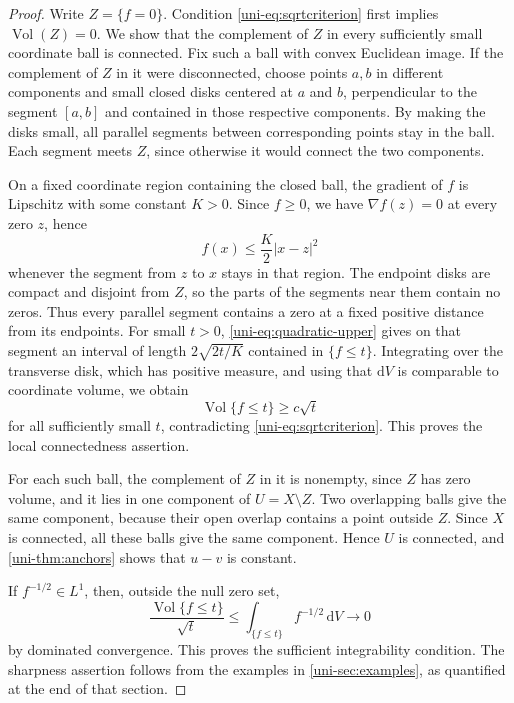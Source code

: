 \begin{proof}
Write $Z=\{f=0\}$.  Condition \eqref{uni-eq:sqrtcriterion} first implies
$\operatorname{Vol}(Z)=0$.  We show that the complement of $Z$ in every sufficiently
small coordinate ball is connected.  Fix such a ball with convex Euclidean
image.  If the complement of $Z$ in it were disconnected, choose points $a,b$ in
different components and small closed disks centered at $a$ and $b$, perpendicular to the
segment $[a,b]$ and contained in those respective components.  By making
the disks small, all parallel segments between corresponding points stay
in the ball.  Each segment meets $Z$, since otherwise it would connect
the two components.

On a fixed coordinate region containing the closed ball, the gradient of $f$ is
Lipschitz with some constant $K>0$.  Since $f\geq0$, we have
$\nabla f(z)=0$ at every zero $z$, hence
\begin{equation}\label{uni-eq:quadratic-upper}
 f(x)\leq\frac K2|x-z|^2
\end{equation}
whenever the segment from $z$ to $x$ stays in that region.  The endpoint
disks are compact and disjoint from $Z$, so the parts of the segments near them
contain no zeros.  Thus every parallel segment contains a zero
at a fixed positive distance from its endpoints.  For small $t>0$,
\eqref{uni-eq:quadratic-upper} gives on that segment an interval of length
$2\sqrt{2t/K}$ contained in $\{f\leq t\}$.  Integrating over the
transverse disk, which has positive measure, and using that $\mathrm{d}V$ is comparable to
coordinate volume, we obtain
\[
 \operatorname{Vol}\{f\leq t\}\geq c\sqrt t
\]
for all sufficiently small $t$, contradicting
\eqref{uni-eq:sqrtcriterion}.  This proves the local connectedness assertion.

For each such ball, the complement of $Z$ in it is nonempty, since $Z$ has zero
volume, and it lies in one component of $U=X\setminus Z$.
Two overlapping balls give the same component, because their open overlap
contains a point outside $Z$.  Since $X$ is connected, all these balls give the same component.
Hence $U$ is connected,
and \cref{uni-thm:anchors} shows that $u-v$ is constant.

If $f^{-1/2}\in L^1$, then, outside the null zero set,
\[
 \frac{\operatorname{Vol}\{f\leq t\}}{\sqrt t}
 \leq\int_{\{f\leq t\}}f^{-1/2}\,\mathrm{d}V\longrightarrow0
\]
by dominated convergence.  This proves the sufficient integrability
condition.  The sharpness assertion follows from the examples in
\cref{uni-sec:examples}, as quantified at the end of that section.
\end{proof}
